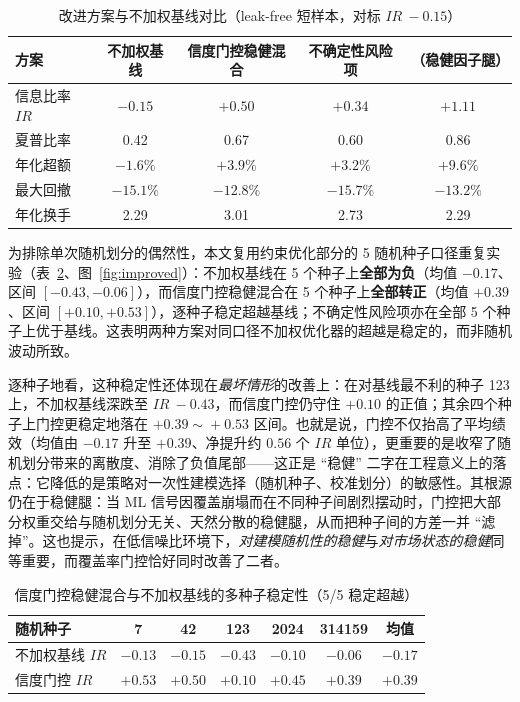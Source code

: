 \begin{table}[htbp]
\centering
\caption{改进方案与不加权基线对比（leak-free 短样本，对标 $IR\ -0.15$）}
\label{tab:improved}
\begin{tabular}{lcccc}
\toprule
\textbf{方案} & \textbf{不加权基线} & \textbf{信度门控稳健混合} & \textbf{不确定性风险项} & \textbf{（稳健因子腿）} \\
\midrule
信息比率 $IR$ & $-0.15$ & \textbf{$+0.50$} & \textbf{$+0.34$} & $+1.11$ \\
夏普比率 & 0.42 & 0.67 & 0.60 & 0.86 \\
年化超额 & $-1.6\%$ & $+3.9\%$ & $+3.2\%$ & $+9.6\%$ \\
最大回撤 & $-15.1\%$ & $-12.8\%$ & $-15.7\%$ & $-13.2\%$ \\
年化换手 & 2.29 & 3.01 & 2.73 & 2.29 \\
\bottomrule
\end{tabular}
\end{table}

为排除单次随机划分的偶然性，本文复用约束优化部分的 5 随机种子口径重复实验（表~\ref{tab:seeds}、图~\ref{fig:improved}）：不加权基线在 5 个种子上\textbf{全部为负}（均值 $-0.17$、区间 $[-0.43, -0.06]$），而信度门控稳健混合在 5 个种子上\textbf{全部转正}（均值 $+0.39$、区间 $[+0.10, +0.53]$），逐种子稳定超越基线；不确定性风险项亦在全部 5 个种子上优于基线。这表明两种方案对同口径不加权优化器的超越是稳定的，而非随机波动所致。

逐种子地看，这种稳定性还体现在\emph{最坏情形}的改善上：在对基线最不利的种子 123 上，不加权基线深跌至 $IR\ -0.43$，而信度门控仍守住 $+0.10$ 的正值；其余四个种子上门控更稳定地落在 $+0.39\!\sim\!+0.53$ 区间。也就是说，门控不仅抬高了平均绩效（均值由 $-0.17$ 升至 $+0.39$、净提升约 $0.56$ 个 $IR$ 单位），更重要的是收窄了随机划分带来的离散度、消除了负值尾部——这正是 ``稳健'' 二字在工程意义上的落点：它降低的是策略对一次性建模选择（随机种子、校准划分）的敏感性。其根源仍在于稳健腿：当 ML 信号因覆盖崩塌而在不同种子间剧烈摆动时，门控把大部分权重交给与随机划分无关、天然分散的稳健腿，从而把种子间的方差一并 ``滤掉''。这也提示，在低信噪比环境下，\emph{对建模随机性的稳健}与\emph{对市场状态的稳健}同等重要，而覆盖率门控恰好同时改善了二者。

\begin{table}[htbp]
\centering
\caption{信度门控稳健混合与不加权基线的多种子稳定性（5/5 稳定超越）}
\label{tab:seeds}
\begin{tabular}{lcccccc}
\toprule
\textbf{随机种子} & 7 & 42 & 123 & 2024 & 314159 & \textbf{均值} \\
\midrule
不加权基线 $IR$ & $-0.13$ & $-0.15$ & $-0.43$ & $-0.10$ & $-0.06$ & \textbf{$-0.17$} \\
信度门控 $IR$ & $+0.53$ & $+0.50$ & $+0.10$ & $+0.45$ & $+0.39$ & \textbf{$+0.39$} \\
\bottomrule
\end{tabular}
\end{table}


